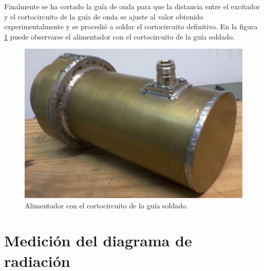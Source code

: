 Finalmente se ha cortado la guía de onda para que la distancia entre el excitador y el cortocircuito de la guía de onda se ajuste al valor obtenido experimentalmente y se procedió a soldar el cortocircuito definitivo. En la figura \ref{fig_resultados:16} puede observarse el alimentador con el cortocircuito de la guía soldado.
\begin{figure}[H]
\centering
\includegraphics[scale = 0.3]{Figures/Resultados/resultados_16}
\caption{Alimentador con el cortocircuito de la guía soldado.}
\label{fig_resultados:16}
\end{figure}

\section{Medición del diagrama de radiación}
\label{sec_resultados_med_dia_rad}


